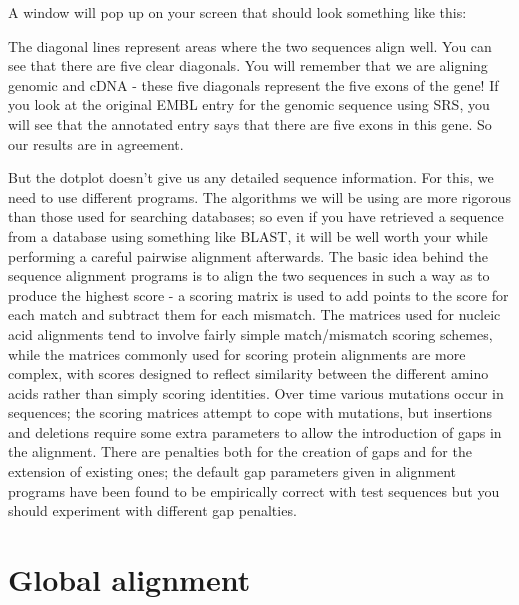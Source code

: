 \documentclass[12pt]{report}
\begin{document}
A window will pop up on your screen that should look something like this:

\begin{figure}[H]
\begin{center}
\end{center}
\label{fig:image-hierarchy}
\end{figure}


The diagonal lines represent areas where the two sequences align
well. You can see that there are five clear diagonals. You will
remember that we are aligning genomic and cDNA - these five diagonals
represent the five exons of the gene! If you look at the original
EMBL entry for the genomic sequence using SRS, you will
see that the annotated entry says that there are five exons in this
gene. So our results are in agreement.

But the dotplot doesn't give us any detailed sequence information. For
this, we need to use different programs. The algorithms we will be
using are more rigorous than those used for searching databases; so
even if you have retrieved a sequence from a database using something
like BLAST, it will be well worth your while performing a careful
pairwise alignment afterwards. The basic idea behind the sequence
alignment programs is to align the two sequences in such a way as to
produce the highest score - a scoring matrix is used to add points to
the score for each match and subtract them for each mismatch. The
matrices used for nucleic acid alignments tend to involve fairly
simple match/mismatch scoring schemes, while the matrices commonly
used for scoring protein alignments are more complex, with scores
designed to reflect similarity between the different amino acids
rather than simply scoring identities. Over time various mutations
occur in sequences; the scoring matrices attempt to cope with
mutations, but insertions and deletions require some extra parameters
to allow the introduction of gaps in the alignment. There are
penalties both for the creation of gaps and for the extension of
existing ones; the default gap parameters given in alignment programs
have been found to be empirically correct with test sequences but you
should experiment with different gap penalties.

\section{Global alignment}
\end{document}
